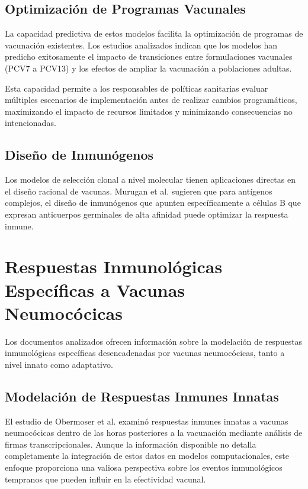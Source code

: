 \subsection{Optimización de Programas Vacunales}

La capacidad predictiva de estos modelos facilita la optimización de programas de vacunación existentes. Los estudios analizados indican que los modelos han predicho exitosamente el impacto de transiciones entre formulaciones vacunales (PCV7 a PCV13) y los efectos de ampliar la vacunación a poblaciones adultas.

Esta capacidad permite a los responsables de políticas sanitarias evaluar múltiples escenarios de implementación antes de realizar cambios programáticos, maximizando el impacto de recursos limitados y minimizando consecuencias no intencionadas.

\subsection{Diseño de Inmunógenos}

Los modelos de selección clonal a nivel molecular tienen aplicaciones directas en el diseño racional de vacunas. Murugan et al. \cite{Murugan2018} sugieren que para antígenos complejos, el diseño de inmunógenos que apunten específicamente a células B que expresan anticuerpos germinales de alta afinidad puede optimizar la respuesta inmune.


\section{Respuestas Inmunológicas Específicas a Vacunas Neumocócicas}

Los documentos analizados ofrecen información sobre la modelación de respuestas inmunológicas específicas desencadenadas por vacunas neumocócicas, tanto a nivel innato como adaptativo.

\subsection{Modelación de Respuestas Inmunes Innatas}

El estudio de Obermoser et al. \cite{Obermoser2013} examinó respuestas inmunes innatas a vacunas neumocócicas dentro de las horas posteriores a la vacunación mediante análisis de firmas transcripcionales. Aunque la información disponible no detalla completamente la integración de estos datos en modelos computacionales, este enfoque proporciona una valiosa perspectiva sobre los eventos inmunológicos tempranos que pueden influir en la efectividad vacunal.

